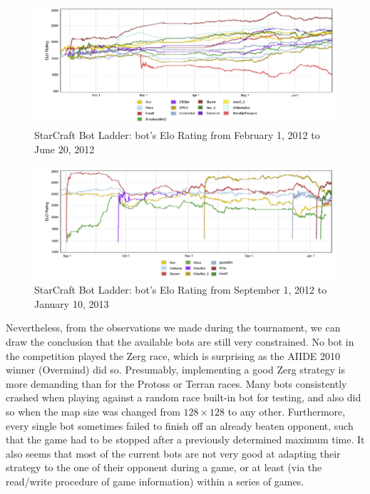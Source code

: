 \documentclass[journal]{IEEEtran}
\begin{document}
\begin{figure}[tb]
    \centering
    \includegraphics[width=\textwidth]{figures/botLadder1.pdf}
    \caption{StarCraft Bot Ladder: bot's Elo Rating from February 1, 2012 to June 20, 2012}
    \label{fig:botLadder1}
\end{figure}

\begin{figure}[tb]
    \centering
    \includegraphics[width=\textwidth]{figures/botLadder2.pdf}
    \caption{StarCraft Bot Ladder: bot's Elo Rating from September 1, 2012 to January 10, 2013}
    \label{fig:botLadder2}
\end{figure}

Nevertheless, from the observations we made during the tournament,
we can draw the conclusion that the available bots are still 
very constrained. No bot in the competition played the Zerg race,
which is surprising as the AIIDE 2010 winner (Overmind) did so.
Presumably, implementing a good Zerg strategy is more demanding
than for the Protoss or Terran races. Many bots consistently crashed
when playing against a random race built-in bot for testing, and
also did so when the map size was changed from $128\times 128$ to 
any other. Furthermore, every single bot sometimes failed to finish
off an already beaten opponent, such that the game had to be stopped
after a previously determined maximum time. It also seems that most of
the current bots are not very good at adapting their strategy to the
one of their opponent during a game, or at least (via the read/write
procedure of game information) within a series of games.
\end{document}
